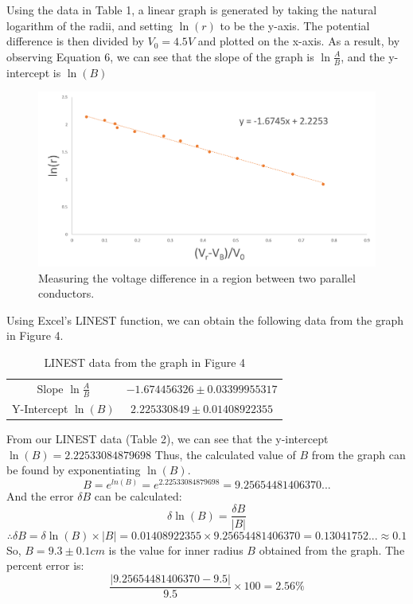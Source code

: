 \documentclass[letterpaper]{article}
\begin{document}
Using the data in Table 1, a linear graph is generated by taking the natural logarithm of the
radii, and setting $\ln{(r)}$ to be the y-axis. The potential difference is then divided by $V_0=4.5 V$
and plotted on the x-axis. As a result, by observing Equation 6, we can see that the
slope of the graph is $\ln{\frac{A}{B}}$, and the y-intercept is $\ln{(B)}$
\begin{figure}[H]
  \centering
  \includegraphics[width=\textwidth]{chart1.png}
  \caption{Measuring the voltage difference in a region between two parallel conductors.}
\end{figure}
\newpage
Using Excel's LINEST function, we can obtain the following data from the graph in Figure 4.
\begin{table}[H]
\centering
\begin{tabular}{cc}
  Slope  $\ln{\frac{A}{B}}$ &  $-1.674456326\pm0.03399955317$ \\
  Y-Intercept $\ln{(B)}$   &  $2.225330849\pm0.01408922355$ \\
\end{tabular}
\caption{LINEST data from the graph in Figure 4}
\end{table}


From our LINEST data (Table 2), we can see that the y-intercept $\ln{(B)}=2.22533084879698$
Thus, the calculated value of $B$ from the graph can be found by exponentiating $\ln{(B)}$.\\
  $$B= e^{ln(B)} = e^{2.22533084879698}=9.25654481406370...$$
And the error $\delta B$ can be calculated:
$$ \delta \ln{(B)} = \frac{\delta B}{|B|}$$
$$ \therefore \delta B = \delta \ln{(B)} \times |B| = 0.01408922355 \times 9.25654481406370 = 0.13041752...\approx 0.1  $$
So, $B=9.3\pm 0.1 cm$ is the value for inner radius $B$ obtained from the graph.
The percent error is:
$$ \frac{|9.25654481406370-9.5|}{9.5}\times100 = 2.56\%$$
\end{document}
